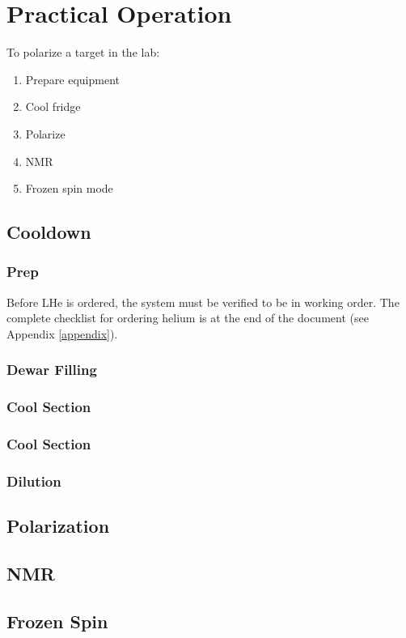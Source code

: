 \chapter{Practical Operation} 
To polarize a target in the lab:
\begin{enumerate}
 \item Prepare equipment
 \item Cool fridge
 \item Polarize
 \item NMR
 \item Frozen spin mode
\end{enumerate}

\section{Cooldown}
\subsection{Prep}
Before LHe is ordered, the system must be verified to be in working order.  The complete checklist for ordering helium is at the end of the document (see Appendix \ref{appendix}).
\subsection{Dewar Filling}
\subsection{Cool \hef{} Section}
\subsection{Cool \het{} Section}
\subsection{Dilution}

\section{Polarization}

\section{NMR}

\section{Frozen Spin}
\blindtext
